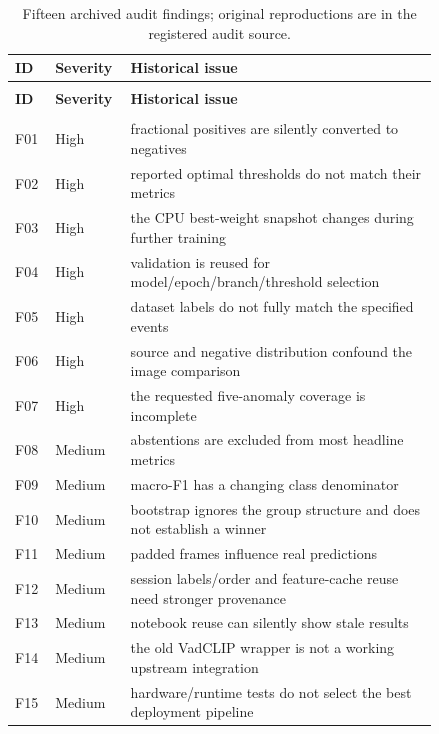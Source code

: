 \begingroup\footnotesize
\setlength{\LTpre}{5pt}\setlength{\LTpost}{8pt}
\begin{longtable}{@{}>{\raggedright\arraybackslash}p{0.0737\linewidth}>{\raggedright\arraybackslash}p{0.1032\linewidth}>{\raggedright\arraybackslash}p{0.6632\linewidth}@{}}
\caption[Historical audit]{Fifteen archived audit findings; original reproductions are in the registered audit source.}\label{tab:historical_audit}\\
\toprule
\textbf{ID} & \textbf{Severity} & \textbf{Historical issue} \\
\midrule\endfirsthead
\multicolumn{3}{l}{\textit{Table \thetable\ continued}}\\
\toprule
\textbf{ID} & \textbf{Severity} & \textbf{Historical issue} \\
\midrule\endhead
\midrule\multicolumn{3}{r}{\textit{Continued on next page}}\\\endfoot
\bottomrule\endlastfoot
F01 & High & fractional positives are silently converted to negatives \\
F02 & High & reported optimal thresholds do not match their metrics \\
F03 & High & the CPU best-weight snapshot changes during further training \\
F04 & High & validation is reused for model/epoch/branch/threshold selection \\
F05 & High & dataset labels do not fully match the specified events \\
F06 & High & source and negative distribution confound the image comparison \\
F07 & High & the requested five-anomaly coverage is incomplete \\
F08 & Medium & abstentions are excluded from most headline metrics \\
F09 & Medium & macro-F1 has a changing class denominator \\
F10 & Medium & bootstrap ignores the group structure and does not establish a winner \\
F11 & Medium & padded frames influence real predictions \\
F12 & Medium & session labels/order and feature-cache reuse need stronger provenance \\
F13 & Medium & notebook reuse can silently show stale results \\
F14 & Medium & the old VadCLIP wrapper is not a working upstream integration \\
F15 & Medium & hardware/runtime tests do not select the best deployment pipeline \\
\end{longtable}\endgroup
